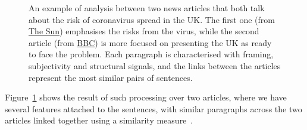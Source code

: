 
\begin{figure}[!b]
    \centering
    \caption{An example of analysis between two news articles that both talk about the risk of coronavirus spread in the UK. The first one (from \href{https://www.thesun.co.uk/news/10822050/coronavirus-uk-nhs-staff-china/}{The Sun}) emphasises the risks from the virus, while the second article (from \href{https://www.bbc.co.uk/news/uk-51221915}{BBC}) is more focused on presenting the UK as ready to face the problem.
    Each paragraph is characterised with framing, subjectivity and structural signals, and the links between the articles represent the most similar pairs of sentences.}
    \label{fig:comparison}
\end{figure}
\begin{comment}
    \begin{figure}[!h]
        \centering
        \texttt{[image: figures/sketches-pipeline.pdf]}
        \caption{The processing pipeline.}
        \label{fig:pipeline}
    \end{figure}
\end{comment}

Figure~\ref{fig:comparison} shows the result of such processing over two articles, where we have several features
attached to the sentences, with similar paragraphs across the two articles linked together using a similarity measure~\cite{cer2018universal}.

